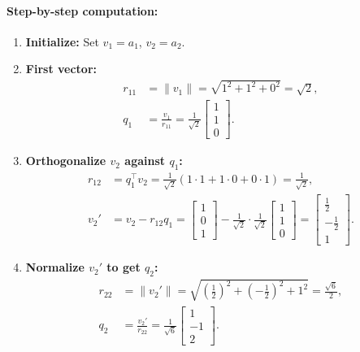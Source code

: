 \paragraph{Step-by-step computation:}
\begin{enumerate}
    \item \textbf{Initialize:} Set $v_1 = a_1$, $v_2 = a_2$.
    \item \textbf{First vector:}
          \begin{align*}
              r_{11} & = \|v_1\| = \sqrt{1^2 + 1^2 + 0^2} = \sqrt{2},                                       \\
              q_1    & = \frac{v_1}{r_{11}} = \frac{1}{\sqrt{2}} \begin{bmatrix} 1 \\ 1 \\ 0 \end{bmatrix}.
          \end{align*}
    \item \textbf{Orthogonalize $v_2$ against $q_1$:}
          \begin{align*}
              r_{12} & = q_1^\top v_2 = \frac{1}{\sqrt{2}} (1 \cdot 1 + 1 \cdot 0 + 0 \cdot 1) = \frac{1}{\sqrt{2}},                                                                                                                            \\
              v_2'   & = v_2 - r_{12} q_1 = \begin{bmatrix} 1 \\ 0 \\ 1 \end{bmatrix} - \frac{1}{\sqrt{2}} \cdot \frac{1}{\sqrt{2}} \begin{bmatrix} 1 \\ 1 \\ 0 \end{bmatrix} = \begin{bmatrix} \frac{1}{2} \\ -\frac{1}{2} \\ 1 \end{bmatrix}.
          \end{align*}
    \item \textbf{Normalize $v_2'$ to get $q_2$:}
          \begin{align*}
              r_{22} & = \|v_2'\| = \sqrt{\left(\frac{1}{2}\right)^2 + \left(-\frac{1}{2}\right)^2 + 1^2} = \frac{\sqrt{6}}{2}, \\
              q_2    & = \frac{v_2'}{r_{22}} = \frac{1}{\sqrt{6}} \begin{bmatrix} 1 \\ -1 \\ 2 \end{bmatrix}.
          \end{align*}
\end{enumerate}

